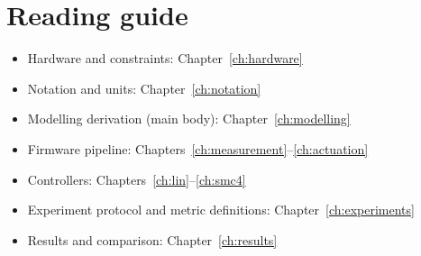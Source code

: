 \section{Reading guide}
\begin{itemize}
  \item Hardware and constraints: Chapter~\ref{ch:hardware}
  \item Notation and units: Chapter~\ref{ch:notation}
  \item Modelling derivation (main body): Chapter~\ref{ch:modelling}
  \item Firmware pipeline: Chapters~\ref{ch:measurement}--\ref{ch:actuation}
  \item Controllers: Chapters~\ref{ch:lin}--\ref{ch:smc4}
  \item Experiment protocol and metric definitions: Chapter~\ref{ch:experiments}
  \item Results and comparison: Chapter~\ref{ch:results}
\end{itemize}

